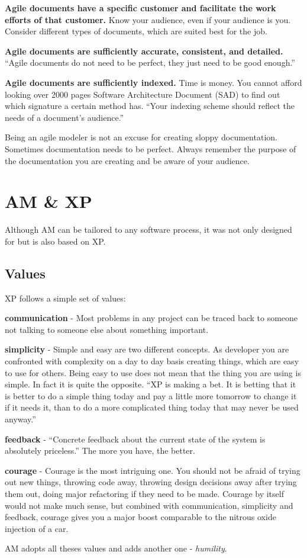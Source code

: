 \begin{description}
\item {\bf Agile documents have a specific customer and facilitate the work
efforts of that customer.} Know your audience, even if your audience is you.
Consider different types of documents, which are suited best for the job.
\item {\bf Agile documents are sufficiently accurate, consistent, and detailed.}
\enquote{Agile documents do not need to be perfect, they just need to be good
enough.}\cite{Ambler200204}
\item {\bf Agile documents are sufficiently indexed.} Time is money. You cannot
afford looking over 2000 pages Software Architecture Document (SAD) to find out
which signature a certain method has. \enquote{Your indexing scheme
should reflect the needs of a document's audience.}\cite{Ambler200204}
\end{description}
Being an agile modeler is not an excuse for creating sloppy documentation.
Sometimes documentation needs to be perfect. Always remember the purpose of the
documentation you are creating and be aware of your audience.

\section{AM \& XP}
Although AM can be tailored to any software process, it was not only designed
for but is also based on XP. 
\subsection{Values}
XP follows a simple set of values:
\begin{description}
  \item {\bf communication} - Most problems in any project can be traced back to
  someone not talking to someone else about something important.
  \item {\bf simplicity} - Simple and easy are two different concepts. As
  developer you are confronted with complexity on a day to day basis creating
  things, which are easy to use for others. Being easy to use does not mean that
  the thing you are using is simple. In fact it is quite the opposite.
  \enquote{XP is making a bet. It is betting that it is better to do a simple
  thing today and pay a little more tomorrow to change it if it needs it, than to do a more
  complicated thing today that may never be used anyway.}\cite{BeckAndres200411}
  \item {\bf feedback} - \enquote{Concrete feedback about
the current state of the system is absolutely priceless.}\cite{BeckAndres200411}
The more you have, the better.
  \item {\bf courage} - Courage is the most intriguing one. You should not be
  afraid of trying out new things, throwing code away, throwing design decisions
  away after trying them out, doing major refactoring if they need to be made.
  Courage by itself would not make much sense, but combined with communication,
  simplicity and feedback, courage gives you a major boost comparable to
  the nitrous oxide injection of a car.
\end{description}
AM adopts all theses values and adds another one - \emph{humility}.
